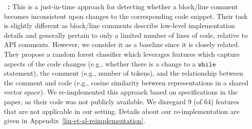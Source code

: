 \documentclass[letterpaper]{article} %
\newcommand{\CodeIn}[1]{{\ifmmode{\mathtt{#1}}\else$\mathtt{#1}$\fi}}
\newcommand{\JustInTime}{just-in-time}
\begin{document}
\noindent\textbf{\citeauthor{LiuOutdatedLine}~:} This is a \JustInTime{} approach for detecting whether a block/line comment becomes inconsistent upon changes to the corresponding code snippet. Their task is slightly different as block/line comments describe low-level implementation details and generally pertain to only a limited number of lines of code, relative to API comments. However, we consider it as a baseline since it is closely related. They propose a random forest classifier which leverages features which capture aspects of the code changes (e.g., whether there is a change to a \CodeIn{while} statement), the comment (e.g., number of tokens), and the relationship between the comment and code (e.g., cosine similarity between representations in a shared vector space). We re-implemented this approach based on specifications in the paper, as their code was not publicly available. We disregard 9 (of 64) features that are not applicable in our setting.
Details about our re-implementation are given in Appendix~\ref{liu-et-al-reimplementation}.
\end{document}
